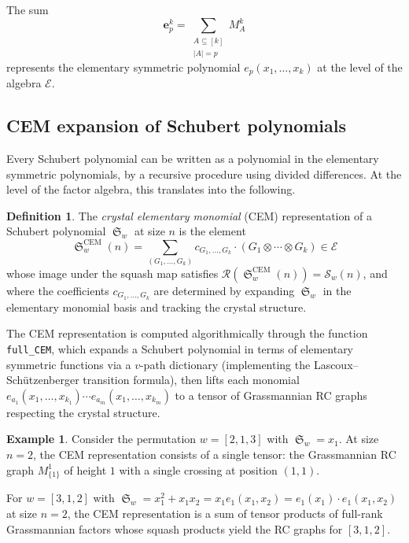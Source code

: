 \documentclass{amsart}
\theoremstyle{definition}
\newtheorem{definition}[lemma]{Definition}
\newtheorem{example}[lemma]{Example}
\theoremstyle{remark}
\numberwithin{equation}{section}
\DeclareMathOperator{\sch}{\mathfrak{S}}
\begin{document}
The sum
\[
\mathbf{e}_p^k = \sum_{\substack{A \subseteq [k] \\ |A| = p}} M_A^k
\]
represents the elementary symmetric polynomial $e_p(x_1, \ldots, x_k)$ at the level of the algebra $\mathcal{E}$.

\subsection{CEM expansion of Schubert polynomials}

Every Schubert polynomial can be written as a polynomial in the elementary symmetric polynomials, by a recursive procedure using divided differences.  At the level of the factor algebra, this translates into the following.

\begin{definition}\label{definition:cem}
The \textit{crystal elementary monomial} (CEM) representation of a Schubert polynomial $\sch_w$ at size $n$ is the element
\[
\sch_w^{\mathrm{CEM}}(n) = \sum_{(G_1, \ldots, G_k)} c_{G_1, \ldots, G_k} \cdot (G_1 \otimes \cdots \otimes G_k) \in \mathcal{E}
\]
whose image under the squash map satisfies $\mathcal{R}(\sch_w^{\mathrm{CEM}}(n)) = \mathcal{S}_w(n)$, and where the coefficients $c_{G_1, \ldots, G_k}$ are determined by expanding $\sch_w$ in the elementary monomial basis and tracking the crystal structure.
\end{definition}

The CEM representation is computed algorithmically through the function \texttt{full\_CEM}, which expands a Schubert polynomial in terms of elementary symmetric functions via a $v$-path dictionary (implementing the Lascoux--Sch\"utzenberger transition formula), then lifts each monomial $e_{a_1}(x_1, \ldots, x_{k_1}) \cdots e_{a_m}(x_1, \ldots, x_{k_m})$ to a tensor of Grassmannian RC graphs respecting the crystal structure.

\begin{example}
Consider the permutation $w = [2, 1, 3]$ with $\sch_w = x_1$.  At size $n = 2$, the CEM representation consists of a single tensor: the Grassmannian RC graph $M_{\{1\}}^1$ of height $1$ with a single crossing at position $(1,1)$.

For $w = [3, 1, 2]$ with $\sch_w = x_1^2 + x_1 x_2 = x_1 e_1(x_1, x_2) = e_1(x_1) \cdot e_1(x_1, x_2)$ at size $n = 2$, the CEM representation is a sum of tensor products of full-rank Grassmannian factors whose squash products yield the RC graphs for $[3, 1, 2]$.
\end{example}
\end{document}
